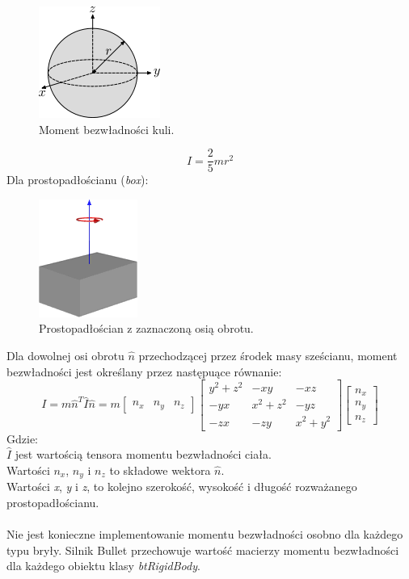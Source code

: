 \begin{figure}[h]
\centering
\includegraphics{./img/inertiaSphere.png}
\caption{Moment bezwładności kuli.}
\label{fig:inertiaSphere}
\end{figure}

\begin{equation}
I = \frac{2}{5}mr^{2}
\end{equation}
Dla prostopadłościanu (\emph{box}):\\

\begin{figure}[h]
\centering
\includegraphics{./img/inertiaBox.png}
\caption{Prostopadłościan z zaznaczoną osią obrotu.}
\label{fig:inertiaBox}
\end{figure}

Dla dowolnej osi obrotu $ \hat{n} $ przechodzącej przez środek masy sześcianu,
moment bezwładności jest określany przez następuące równanie:
\begin{equation}
I = m\hat{n}^{T}\hat{I}\hat{n} = m
\begin{bmatrix}n_{x}&n_{y}&n_{z}\end{bmatrix}
\begin{bmatrix}y^{2}+z^{2}&-xy&-xz\\-yx&x^{2}+z^{2}&-yz\\-zx&-zy&x^{2}+y^{2}\end{bmatrix}
\begin{bmatrix}n_{x}\\n_{y}\\n_{z}\end{bmatrix}
\label{eq:boxInertia}
\end{equation}
Gdzie:\\
$\hat{I}$ jest wartością tensora momentu bezwładności ciała.\\
Wartości $n_{x}$, $n_{y}$ i $n_{z}$ to składowe wektora $\hat{n}$.\\
Wartości \emph{x}, \emph{y} i \emph{z}, to kolejno szerokość, wysokość i długość
rozważanego prostopadłościanu.\\ \\
Nie jest konieczne implementowanie momentu bezwładności osobno dla każdego typu
bryły. Silnik Bullet przechowuje wartość macierzy momentu bezwładności dla
każdego obiektu klasy \emph{btRigidBody}.

